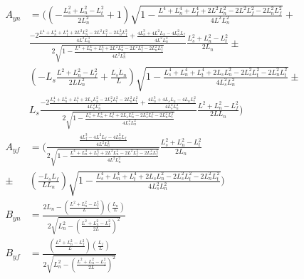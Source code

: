 \documentclass[11pt, landscape]{article}
\begin{document}
\begin{align}
  A_{yn} &= \Bigg(\left(-\frac{L_{s}^2+L_{n}^2-L_{t}^2}{2L_n^2} + 1\right)\sqrt{1-\frac{L^4 + L_n^4 + L_f^4 + 2L^2L_n^2 - 2L^2L_f^2 - 2L_n^2L_f^2}{4L^2L_n^2}} +\\
    &\frac{-2\frac{L^4 + L_n^4 + L_f^4 + 2L^2L_n^2 - 2L^2L_f^2 - 2L_n^2L_f^2}{4L^2L_n^3} + \frac{4L_n^3 + 4L^2L_n - 4L_n^2L_f}{4L^2L_n^2}}{2\sqrt{1-\frac{L^4 + L_n^4 + L_f^4 + 2L^2L_n^2 - 2L^2L_f^2 - 2L_n^2L_f^2}{4L^2L_n^2}}}\frac{L_{s}^2+L_{n}^2-L_{t}^2}{2L_{n}} \pm\\
    &\left(-L_s\frac{L^2+L_{n}^2-L_{f}^2}{2LL_{n}^2} + \frac{L_s\dot{L}_n}{L}\right)\sqrt{1-\frac{L_s^4 + L_n^4 + L_t^4 + 2L_sL_n^2 - 2L_s^2L_t^2 - 2L_n^2L_t^2}{4L_s^2L_n^2}} \pm\\
    &L_s\frac{-2\frac{L_s^4 + L_n^4 + L_t^4 + 2L_sL_n^2 - 2L_s^2L_t^2 - 2L_n^2L_t^2}{4L_s^2L_n^3} + \frac{4L_n^3 + 4L_sL_n - 4L_nL_t^2}{4L_s^2L_n^2}}{2\sqrt{1-\frac{L_s^4 + L_n^4 + L_t^4 + 2L_sL_n^2 - 2L_s^2L_t^2 - 2L_n^2L_t^2}{4L_s^2L_n^2}}}\frac{L^2+L_{n}^2-L_{f}^2}{2LL_{n}}\Bigg)\\
  A_{yf} &= \Bigg(\frac{\frac{4L_f^3 - 4L^2L_f - 4L_n^2L_f}{4L^2L_n^2}}{2\sqrt{1-\frac{L^4 + L_n^4 + L_f^4 + 2L^2L_n^2 - 2L^2L_f^2 - 2L_n^2L_f^2}{4L^2L_n^2}}}\frac{L_{s}^2+L_{n}^2-L_{t}^2}{2L_{n}}\\
    \pm &\left(\frac{-L_sL_{f}}{LL_{n}}\right)\sqrt{1-\frac{L_s^4 + L_n^4 + L_t^4 + 2L_sL_n^2 - 2L_s^2L_t^2 - 2L_n^2L_t^2}{4L_s^2L_n^2}}\Bigg)\\
  B_{yn} &= \frac{2L_n - \left(\frac{L^2+L_n^2-L_f^2}{L}\right)\left(\frac{L_n}{L}\right)}{2\sqrt{L_n^2 - \left(\frac{L^2+L_n^2-L_f^2}{2L}\right)^2}}\\
  B_{yf} &= \frac{\left(\frac{L^2+L_n^2-L_f^2}{L}\right)\left(\frac{L_f}{L}\right)}{2\sqrt{L_n^2 - \left(\frac{L^2+L_n^2-L_f^2}{2L}\right)^2}}\\
\end{align}
\end{document}
